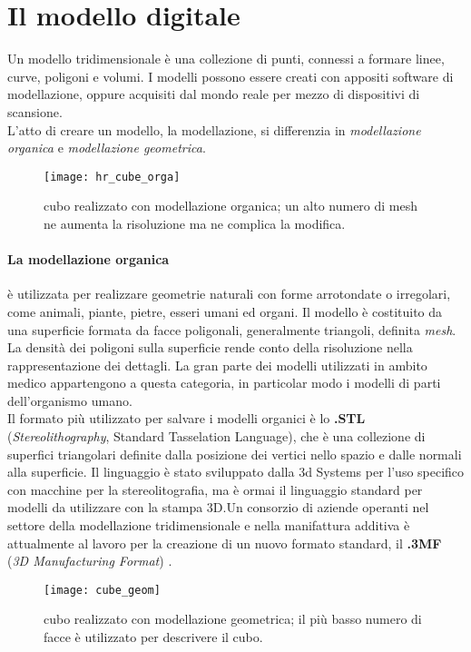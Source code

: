 \section{Il modello digitale}
Un modello tridimensionale è una collezione di punti, connessi a formare linee, curve, poligoni e volumi. I modelli possono essere creati con appositi software di modellazione, oppure acquisiti dal mondo reale per mezzo di dispositivi di scansione.\\
L'atto di creare un modello, la modellazione, si differenzia in \emph{modellazione organica}  e \emph{modellazione geometrica}.
\begin{wrapfigure} {R}{0.35\textwidth}
	\texttt{[image: hr\_cube\_orga]}
    \caption{cubo realizzato con modellazione organica; un alto numero di mesh ne aumenta la risoluzione ma ne complica la modifica.}
    \label{fig:hr_cube_orga}
\end{wrapfigure}
\paragraph{La modellazione organica} è utilizzata per realizzare geometrie naturali con forme arrotondate o irregolari, come animali, piante, pietre, esseri umani ed organi. Il modello è costituito da una superficie formata da facce poligonali, generalmente triangoli, definita \emph{mesh}. La densità dei poligoni sulla superficie rende conto della risoluzione nella rappresentazione dei dettagli. La gran parte dei modelli utilizzati in ambito medico appartengono a questa categoria, in particolar modo i modelli di parti dell'or\-ga\-ni\-smo umano.\\
Il formato più utilizzato per salvare i modelli organici è lo \textbf{.STL} (\emph{Stereolithography}, Standard Tasselation Language), che è una collezione di superfici triangolari definite dalla posizione dei vertici nello spazio e dalle normali alla superficie. Il linguaggio è stato sviluppato dalla 3d Systems per l'uso specifico con macchine per la stereolitografia, ma è ormai il linguaggio standard per modelli da utilizzare con la stampa 3D.Un consorzio di aziende operanti nel settore della modellazione tridimensionale e nella manifattura additiva è attualmente al lavoro per la creazione di un nuovo formato standard, il \textbf{.3MF} (\emph{3D Manufacturing Format}) \parencite{Reference143}.
\begin{wrapfigure} {R} {0.35\textwidth}
	\texttt{[image: cube\_geom]}
    \caption{cubo realizzato con modellazione geometrica; il più basso numero di facce è utilizzato per descrivere il cubo.}
    \label{fig:cube_geom}
\end{wrapfigure}
